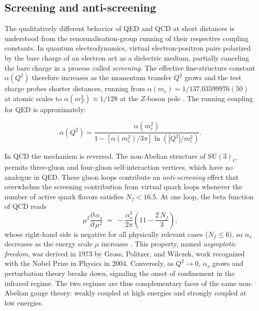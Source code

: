 \FloatBarrier
 
\subsection{Screening and anti-screening}
\label{subsec:screening}
 
The qualitatively different behavior of QED and QCD at short distances is
understood from the renormalisation-group running of their respective coupling
constants. In quantum electrodynamics, virtual electron-positron pairs polarized
by the bare charge of an electron act as a dielectric medium, partially canceling
the bare charge in a process called \emph{screening}. The effective fine-structure
constant $\alpha(Q^2)$ therefore increases as the momentum transfer $Q^2$ grows
and the test charge probes shorter distances, running from $\alpha(m_e) = 1/137.03599976(50)$ at
atomic scales to $\alpha(m_Z^2) \approx 1/128$ at the $Z$-boson pole
\cite[Ch.~7]{HalzenMartin1984}. The running coupling for QED is approximately:

\begin{equation}
    \alpha(Q^2) = \frac{\alpha(m_e^2)}{1 - [\alpha(m_e^2)/3\pi] \ln(|Q^2|/m_e^2)}.
\end{equation}
 
In QCD the mechanism is reversed. The non-Abelian structure of $\mathrm{SU(3)}_{C}$
permits three-gluon and four-gluon self-interaction vertices, which have no analogue
in QED. These gluon loops contribute an \emph{anti-screening} effect that
overwhelms the screening contribution from virtual quark loops whenever the number
of active quark flavors satisfies $N_f < 16.5$. At one loop, the beta function of
QCD reads
\begin{equation}
    \mu^2 \frac{\partial\,\alpha_s}{\partial\,\mu^2}
    \;=\; -\frac{\alpha_s^2}{2\pi}
          \!\left(11 - \frac{2\,N_f}{3}\right),
    \label{eq:beta_qcd}
\end{equation}
whose right-hand side is negative for all physically relevant cases ($N_f \leq 6$),
so $\alpha_s$ decreases as the energy scale $\mu$ increases
\cite[Ch.~7]{HalzenMartin1984}. This property, named \emph{asymptotic freedom},
was derived in 1973 by Gross, Politzer, and Wilczek, work recognized with the
Nobel Prize in Physics in 2004. Conversely, as $Q^2 \to 0$, $\alpha_s$ grows and
perturbation theory breaks down, signaling the onset of confinement in the
infrared regime. The two regimes are thus complementary faces of the same
non-Abelian gauge theory: weakly coupled at high energies and strongly coupled at
low energies.

